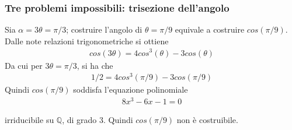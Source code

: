 \documentclass[11pt]{beamer}
\begin{document}
\begin{frame}
\frametitle{Tre problemi impossibili: trisezione dell'angolo}

Sia $\alpha = 3\theta = \pi / 3$; costruire l'angolo di $\theta = \pi / 9$ equivale a costruire $cos(\pi / 9)$. 
Dalle note relazioni trigonometriche si ottiene
\begin{align*}
cos(3\theta) = 4 cos^3(\theta) - 3 cos(\theta)
\end{align*}
Da cui per $3\theta = \pi / 3$, si ha che
\begin{align*}
1/2 = 4 cos^3(\pi / 9) - 3 cos(\pi / 9)
\end{align*}
Quindi $cos(\pi / 9)$ soddisfa l'equazione polinomiale
\begin{align*}
8x^3 - 6x - 1 = 0 
\end{align*}

\noindent
irriducibile su $\mathbb{Q}$, di grado $3$. Quindi  $cos(\pi / 9)$ non è costruibile.

\end{frame}






\end{document}
